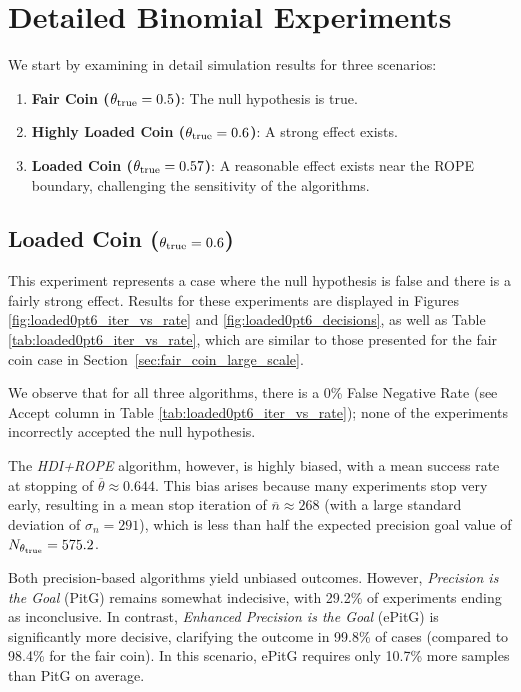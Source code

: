 
\section*{Detailed Binomial Experiments}\label{sec:binomial_appendix}

We start by examining in detail simulation results for three scenarios:
\begin{enumerate}
  \item \textbf{Fair Coin ($\theta_{\rm true}=0.5$)}: The null hypothesis is true.
  \item \textbf{Highly Loaded Coin ($\theta_{\rm true}=0.6$)}: A strong effect exists.
  \item \textbf{Loaded Coin ($\theta_{\rm true}=0.57$)}: A reasonable effect exists near the ROPE boundary, challenging the sensitivity of the algorithms.
\end{enumerate}

\subsection{Loaded Coin ($\theta_{\rm true}=0.6$)}\label{sec:loaded_coin}

This experiment represents a case where the null hypothesis is false and there is a fairly strong effect. Results for these experiments are displayed in Figures \ref{fig:loaded0pt6_iter_vs_rate} and \ref{fig:loaded0pt6_decisions}, as well as Table \ref{tab:loaded0pt6_iter_vs_rate}, which are similar to those presented for the fair coin case in Section~\ref{sec:fair_coin_large_scale}.

We observe that for all three algorithms, there is a 0\% False Negative Rate (see Accept column in Table \ref{tab:loaded0pt6_iter_vs_rate}); none of the experiments incorrectly accepted the null hypothesis.

The \textit{HDI+ROPE} algorithm, however, is highly biased, with a mean success rate at stopping of $\overline{\theta} \approx 0.644$. This bias arises because many experiments stop very early, resulting in a mean stop iteration of $\overline{n} \approx 268$ (with a large standard deviation of $\sigma_n=291$), which is less than half the expected precision goal value of $N_{\theta_{\rm true}}=575.2$.

Both precision-based algorithms yield unbiased outcomes. However, \textit{Precision is the Goal} (PitG) remains somewhat indecisive, with 29.2\% of experiments ending as inconclusive. In contrast, \textit{Enhanced Precision is the Goal} (ePitG) is significantly more decisive, clarifying the outcome in 99.8\% of cases (compared to 98.4\% for the fair coin). In this scenario, ePitG requires only 10.7\% more samples than PitG on average.

